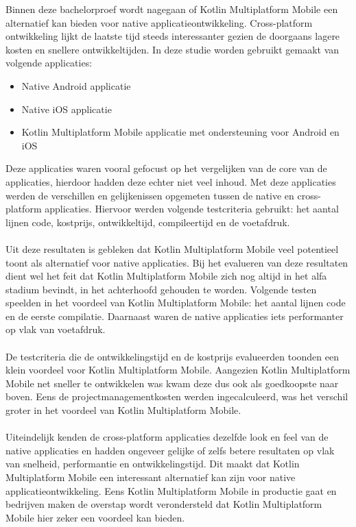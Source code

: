 Binnen deze bachelorproef wordt nagegaan of Kotlin Multiplatform Mobile een alternatief kan bieden voor native applicatieontwikkeling. Cross-platform ontwikkeling lijkt de laatste tijd steeds interessanter gezien de doorgaans lagere kosten en snellere ontwikkeltijden. In deze studie worden  gebruikt gemaakt van volgende applicaties: 
\begin{itemize}
    \item Native Android applicatie
    \item Native iOS applicatie
    \item Kotlin Multiplatform Mobile applicatie met ondersteuning voor Android en iOS
\end{itemize}
Deze applicaties waren vooral gefocust op het vergelijken van de core van de applicaties, hierdoor hadden deze echter niet veel inhoud. Met deze applicaties werden de verschillen en gelijkenissen opgemeten tussen de native en cross-platform applicaties. Hiervoor werden volgende testcriteria gebruikt: het aantal lijnen code, kostprijs, ontwikkeltijd, compileertijd en de voetafdruk.
\\ \\
Uit deze resultaten is gebleken dat Kotlin Multiplatform Mobile veel potentieel toont als alternatief voor native applicaties. Bij het evalueren van deze resultaten dient wel het feit dat Kotlin Multiplatform Mobile zich nog altijd in het alfa stadium bevindt, in het achterhoofd gehouden te worden. Volgende testen speelden in het voordeel van Kotlin Multiplatform Mobile: het aantal lijnen code en de eerste compilatie. Daarnaast waren de native applicaties iets performanter op vlak van voetafdruk.
\\ \\ 
De testcriteria die de ontwikkelingstijd en de kostprijs evalueerden toonden een klein voordeel voor Kotlin Multiplatform Mobile. Aangezien Kotlin Multiplatform Mobile net sneller te ontwikkelen was kwam deze dus ook als goedkoopste naar boven. Eens de projectmanagementkosten werden ingecalculeerd, was het verschil groter in het voordeel van Kotlin Multiplatform Mobile.
\\ \\
Uiteindelijk kenden de cross-platform applicaties dezelfde look en feel van de native applicaties en hadden ongeveer gelijke of zelfs betere resultaten op vlak van snelheid, performantie en ontwikkelingstijd. Dit maakt dat Kotlin Multiplatform Mobile een interessant alternatief kan zijn voor native applicatieontwikkeling. Eens Kotlin Multiplatform Mobile in productie gaat en bedrijven maken de overstap wordt verondersteld dat Kotlin Multiplatform Mobile hier zeker een voordeel kan bieden.
\\ \\
